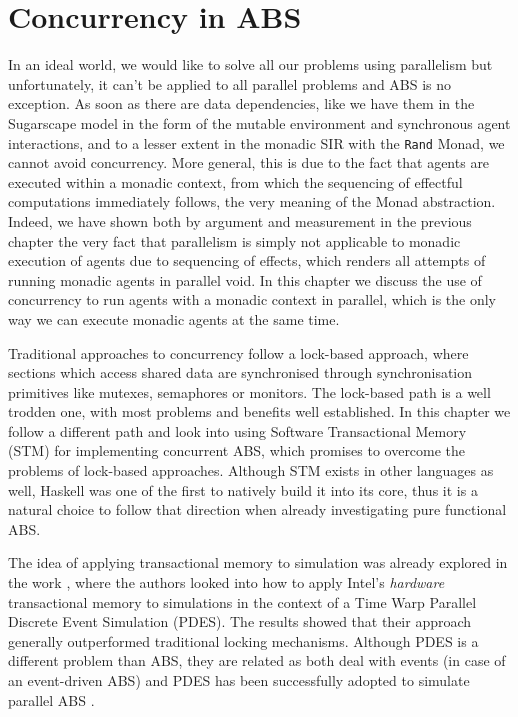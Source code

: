 \chapter{Concurrency in ABS}
\label{ch:concurrent_abs}
In an ideal world, we would like to solve all our problems using parallelism but unfortunately, it can't be applied to all parallel problems and ABS is no exception. As soon as there are data dependencies, like we have them in the Sugarscape model in the form of the mutable environment and synchronous agent interactions, and to a lesser extent in the monadic SIR with the \texttt{Rand} Monad, we cannot avoid concurrency. More general, this is due to the fact that agents are executed within a monadic context, from which the  sequencing of effectful computations immediately follows, the very meaning of the Monad abstraction. Indeed, we have shown both by argument and measurement in the previous chapter the very fact that parallelism is simply not applicable to monadic execution of agents due to sequencing of effects, which renders all attempts of running monadic agents in parallel void. In this chapter we discuss the use of concurrency to run agents with a monadic context in parallel, which is the only way we can execute monadic agents at the same time.

\medskip

Traditional approaches to concurrency follow a lock-based approach, where sections which access shared data are synchronised through synchronisation primitives like mutexes, semaphores or monitors. The lock-based path is a well trodden one, with most problems and benefits well established. In this chapter we follow a different path and look into using Software Transactional Memory (STM) for implementing concurrent ABS, which promises to overcome the problems of lock-based approaches. Although STM exists in other languages as well, Haskell was one of the first to natively build it into its core, thus it is a natural choice to follow that direction when already investigating pure functional ABS.

The idea of applying transactional memory to simulation was already explored in the work \cite{hay_experiments_2015}, where the authors looked into how to apply Intel’s \textit{hardware} transactional memory to simulations in the context of a Time Warp Parallel Discrete Event Simulation (PDES). The results showed that their approach generally outperformed traditional locking mechanisms. Although PDES is a different problem than ABS, they are related as both deal with events (in case of an event-driven ABS) and PDES has been successfully adopted to simulate parallel ABS \cite{suryanarayanan_pdes-mas_2013}.

